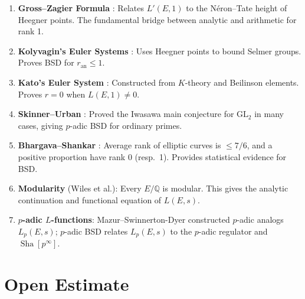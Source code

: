 \documentclass[11pt]{article}
\theoremstyle{definition}
\DeclareMathOperator{\Sha}{Sha}
\begin{document}
\begin{enumerate}
  \item \textbf{Gross--Zagier Formula} \cite{GZ}: Relates $L'(E,1)$ to the
    N\'eron--Tate height of Heegner points.  The fundamental bridge between
    analytic and arithmetic for rank 1.

  \item \textbf{Kolyvagin's Euler Systems} \cite{Koly}: Uses Heegner points
    to bound Selmer groups.  Proves BSD for $r_{\mathrm{an}} \leq 1$.

  \item \textbf{Kato's Euler System} \cite{Kato}: Constructed from
    $K$-theory and Beilinson elements.  Proves $r = 0$ when $L(E,1) \neq 0$.

  \item \textbf{Skinner--Urban} \cite{SU}: Proved the Iwasawa main conjecture
    for $\mathrm{GL}_2$ in many cases, giving $p$-adic BSD for ordinary primes.

  \item \textbf{Bhargava--Shankar} \cite{BS}: Average rank of elliptic curves
    is $\leq 7/6$, and a positive proportion have rank 0 (resp.\ 1).
    Provides statistical evidence for BSD.

  \item \textbf{Modularity} (Wiles et al.): Every $E/\mathbb{Q}$ is modular.
    This gives the analytic continuation and functional equation of $L(E,s)$.

  \item \textbf{$p$-adic $L$-functions}: Mazur--Swinnerton-Dyer constructed
    $p$-adic analogs $L_p(E,s)$; $p$-adic BSD relates $L_p(E,s)$ to the
    $p$-adic regulator and $\Sha[p^\infty]$.
\end{enumerate}

\section{Open Estimate}
\end{document}
